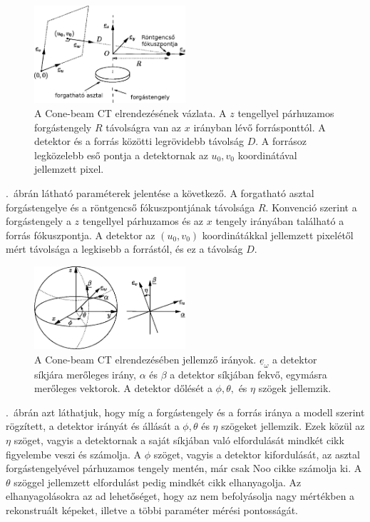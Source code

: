 \documentclass[a4paper,12pt,twoside]{article}
\begin{document}
\begin{figure}[htbp]
\center
\includegraphics[width=0.5\textwidth]{abrak/geom1}
\caption{A Cone-beam CT elrendezésének vázlata\cite{noo}. A $z$ tengellyel párhuzamos forgástengely $R$ távolságra van az $x$ irányban lévő forrásponttól. A detektor és a forrás közötti legrövidebb távolság $D$. A forrásoz legközelebb eső pontja a detektornak az $u_0,v_0$ koordinátával jellemzett pixel. }
\label{fig:geom1}
\end{figure}





.~ábrán látható paraméterek jelentése a következő. A forgatható asztal forgástengelye és a röntgencső fókuszpontjának távolsága $R$. Konvenció szerint a forgástengely a $z$ tengellyel párhuzamos és az $x$ tengely irányában található a forrás fókuszpontja. A detektor az $(u_0,v_0)$ koordinátákkal jellemzett pixelétől mért távolsága a legkisebb a forrástól, és ez a távolság $D$.


\begin{figure}[htbp]
\center
\includegraphics[width=0.5\textwidth]{abrak/geom2}
\caption{A Cone-beam CT elrendezésében jellemző irányok\cite{noo}. $\underline{e}_\omega$ a detektor síkjára merőleges irány, $\alpha$ és $\beta$ a detektor síkjában fekvő, egymásra merőleges vektorok. A detektor dőlését a $\phi, \theta,$ és $\eta$ szögek jellemzik.}
\label{fig:geom2}
\end{figure}



 .~ábrán azt láthatjuk, hogy míg a forgástengely és a forrás iránya  a modell szerint rögzített, a detektor irányát és állását a   $\phi, \theta$ és $\eta$ szögeket jellemzik. Ezek közül az $\eta$ szöget, vagyis a detektornak a saját síkjában való elfordulását mindkét cikk figyelembe veszi és számolja. A $\phi$ szöget, vagyis a detektor kifordulását, az asztal forgástengelyével párhuzamos tengely mentén, már csak Noo\cite{noo} cikke számolja ki. A $\theta$  szöggel jellemzett elfordulást pedig mindkét cikk elhanyagolja. Az elhanyagolásokra az ad lehetőséget, hogy az nem befolyásolja nagy mértékben a rekonstruált képeket, illetve a többi paraméter mérési pontosságát\cite{wu}. 
\end{document}
